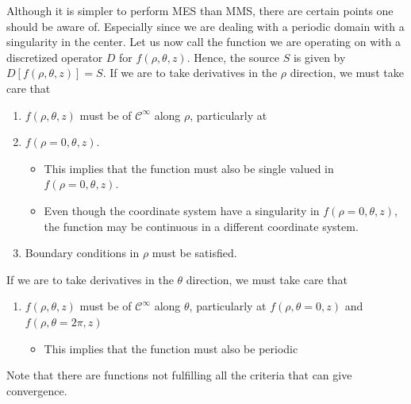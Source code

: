 Although it is simpler to perform MES than MMS, there are certain points one should be aware of.
Especially since we are dealing with a periodic domain with a singularity in the center.
Let us now call the function we are operating on with a discretized operator $D$ for $f(\rho,\theta,z)$.
Hence, the source $S$ is given by $D[f(\rho,\theta,z)]=S$.
If we are to take derivatives in the $\rho$ direction, we must take care that
%
\vspace{0.5cm}
\begin{enumerate}
    \item $f(\rho,\theta,z)$ must be of $\mathcal{C}^\infty$ along $\rho$, particularly at \item $f(\rho=0,\theta,z)$.%
    \begin{itemize}[noitemsep,nolistsep]
            \item This implies that the function must also be single valued in $f(\rho=0,\theta,z)$.
            \item Even though the coordinate system have a singularity in $f(\rho=0,\theta,z)$, the function may be continuous in a different coordinate system.
    \end{itemize}
  \item Boundary conditions in $\rho$ must be satisfied.
\end{enumerate}
\vspace{0.5cm}
%
If we are to take derivatives in the $\theta$ direction, we must take care that
%
\vspace{0.5cm}
\begin{enumerate}
    \item $f(\rho,\theta,z)$ must be of $\mathcal{C}^\infty$ along $\theta$, particularly at $f(\rho,\theta=0,z)$ and $f(\rho,\theta=2\pi,z)$%
    \begin{itemize}[noitemsep,nolistsep]
            \item This implies that the function must also be periodic
    \end{itemize}
\end{enumerate}
\vspace{0.5cm}
%
Note that there are functions not fulfilling all the criteria that can give convergence.

